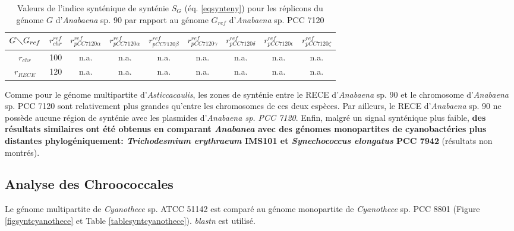 \begin{table}[H]
	\hspace{-1cm}
	\begin{minipage}{\textwidth}
   \begin{center}
			\caption[Valeurs de l'indice synténique pour \textit{Anabaena}]{Valeurs de l'indice synténique de synténie $S_{G}$ (éq. \ref{eqsynteny}) pour les réplicons du génome $G$ d'\textit{Anabaena} sp. 90 par rapport au génome $G_{ref}$ d'\textit{Anabaena} sp. PCC 7120}\label{tablesyntanabaena}
   		\begin{tabular}{c|cccccccc}
   			$G \diagdown G_{ref}$ & $r^{ref}_{chr}$ & $r^{ref}_{pCC7120\alpha}$ & $r^{ref}_{pCC7120\alpha}$ & $r^{ref}_{pCC7120\beta}$ & 
   $r^{ref}_{pCC7120\gamma}$ & $r^{ref}_{pCC7120\delta}$ & $r^{ref}_{pCC7120\epsilon}$
    & $r^{ref}_{pCC7120\zeta}$\\
   			\hline
   			$r_{chr}$ & 100 & n.a. & n.a. & n.a. & n.a. & n.a. & n.a. & n.a.\\
   			$ r_{RECE}$ & 120 & n.a. & n.a. & n.a. & n.a. & n.a. & n.a. & n.a.\\
   		\end{tabular}
   \end{center}
   \end{minipage}
\end{table}

Comme pour le génome multipartite d'\textit{Asticcacaulis}, les zones de synténie entre le RECE d'\textit{Anabaena} sp. 90 et le chromosome d'\textit{Anabaena} sp. PCC 7120 sont relativement plus grandes qu'entre les chromosomes de ces deux espèces. Par ailleurs, le RECE d'\textit{Anabaena} sp. 90 ne possède aucune région de synténie avec les plasmides d'\textit{Anabaena sp. PCC 7120}. Enfin, malgré un signal synténique plus faible, \textbf{des résultats similaires ont été obtenus en comparant \textit{Anabanea} avec des génomes monopartites de cyanobactéries plus distantes phylogéniquement: \textit{Trichodesmium erythraeum} IMS101 et \textit{Synechococcus elongatus} PCC 7942} (résultats non montrés).
 

\subsection{Analyse des Chroococcales}\label{parcyan}
	 Le génome multipartite de \textit{Cyanothece} sp. ATCC 51142 est comparé au génome monopartite de \textit{Cyanothece} sp. PCC 8801 (Figure \ref{figsyntcyanothece} et Table \ref{tablesyntcyanothece}). \textit{blastn} est utilisé. 	

